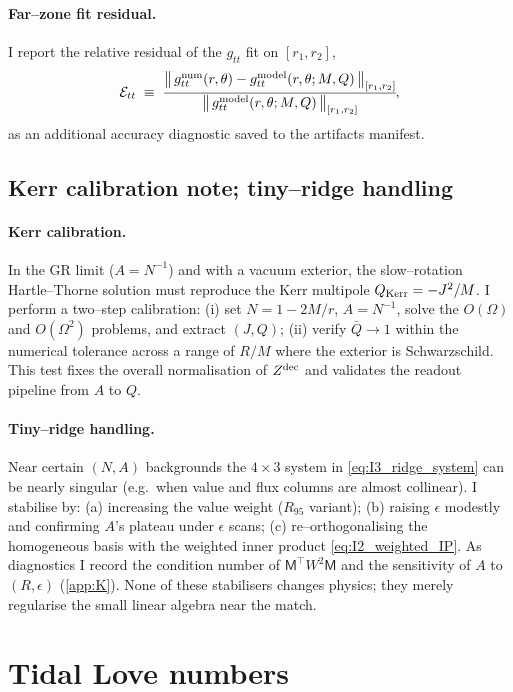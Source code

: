 \documentclass{iopjournal}
\begin{document}
\paragraph{Far–zone fit residual.}
I report the relative residual of the $g_{tt}$ fit on $[r_1,r_2]$,
\begin{equation}
\mathcal E_{tt}\;\equiv\;
\frac{\big\|\,g_{tt}^{\rm num}(r,\theta)-g_{tt}^{\rm model}(r,\theta;M,Q)\,\big\|_{[r_1,r_2]}}
{\big\|\,g_{tt}^{\rm model}(r,\theta;M,Q)\,\big\|_{[r_1,r_2]}}\!,
\label{eq:I4_fit_residual}
\end{equation}
as an additional accuracy diagnostic saved to the artifacts manifest.

\subsection{Kerr calibration note; tiny–ridge handling}\label{app:I5}
\paragraph{Kerr calibration.}
In the GR limit ($A=N^{-1}$) and with a vacuum exterior, the slow–rotation Hartle–Thorne solution must reproduce the Kerr multipole $Q_{\rm Kerr}=-J^{2}/M$. I perform a two–step calibration: (i) set $N=1-2M/r$, $A=N^{-1}$, solve the $O(\Omega)$ and $O(\Omega^{2})$ problems, and extract $(J,Q)$; (ii) verify $\bar{Q}\to 1$ within the numerical tolerance across a range of $R/M$ where the exterior is Schwarzschild. This test fixes the overall normalisation of $Z^{\rm dec}$ and validates the readout pipeline from $A$ to $Q$.

\paragraph{Tiny–ridge handling.}
Near certain $(N,A)$ backgrounds the $4\times3$ system in \eqref{eq:I3_ridge_system} can be nearly singular (e.g.\ when value and flux columns are almost collinear). I stabilise by: (a) increasing the value weight ($R_{95}$ variant); (b) raising $\epsilon$ modestly and confirming $A$'s plateau under $\epsilon$ scans; (c) re–orthogonalising the homogeneous basis with the weighted inner product \eqref{eq:I2_weighted_IP}. As diagnostics I record the condition number of $\mathsf M^\top W^2\mathsf M$ and the sensitivity of $A$ to $(R,\epsilon)$ (\cref{app:K}). None of these stabilisers changes physics; they merely regularise the small linear algebra near the match.

\section{Tidal Love numbers}\label{app:J}
\end{document}
